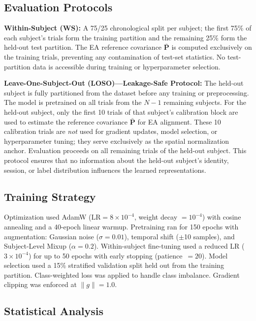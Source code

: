 \documentclass[11pt,a4paper]{article}
\begin{document}
\subsection{Evaluation Protocols}

\textbf{Within-Subject (WS):} A 75/25 chronological split per subject; the
first 75\% of each subject's trials form the training partition and the
remaining 25\% form the held-out test partition.
The EA reference covariance $\bar{\mathbf{P}}$ is computed exclusively on
the training trials, preventing any contamination of test-set statistics.
No test-partition data is accessible during training or hyperparameter
selection.

\textbf{Leave-One-Subject-Out (LOSO)---Leakage-Safe Protocol:}
The held-out subject is fully partitioned from the dataset before any training
or preprocessing.
The model is pretrained on all trials from the $N-1$ remaining subjects.
For the held-out subject, only the first 10 trials of that subject's
calibration block are used to estimate the reference covariance $\bar{\mathbf{P}}$
for EA alignment.
These 10 calibration trials are \emph{not} used for gradient updates, model
selection, or hyperparameter tuning; they serve exclusively as the spatial
normalization anchor.
Evaluation proceeds on all remaining trials of the held-out subject.
This protocol ensures that no information about the held-out subject's identity,
session, or label distribution influences the learned representations.

\subsection{Training Strategy}

Optimization used AdamW ($\text{LR} = 8\times10^{-4}$,
weight decay $= 10^{-4}$) with cosine annealing and a 40-epoch linear warmup.
Pretraining ran for 150 epochs with augmentation: Gaussian noise
($\sigma = 0.01$), temporal shift ($\pm$10 samples), and Subject-Level Mixup
($\alpha = 0.2$).
Within-subject fine-tuning used a reduced LR ($3\times10^{-4}$) for up to
50 epochs with early stopping (patience~$= 20$).
Model selection used a 15\% stratified validation split held out from the
training partition.
Class-weighted loss was applied to handle class imbalance.
Gradient clipping was enforced at $\lVert g \rVert = 1.0$.

\subsection{Statistical Analysis}
\end{document}
